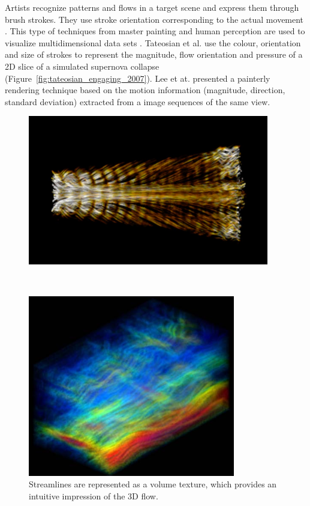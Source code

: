 Artists recognize patterns and flows in a target scene and express them through brush strokes. They use stroke orientation corresponding to the actual movement \cite{lee_motion_2009}. This type of techniques from master painting and human perception are used to visualize multidimensional data sets \cite{healey_perceptually_2004}. Tateosian et al. \cite{tateosian_engaging_2007} use the colour, orientation and size of strokes to represent the magnitude, flow orientation and pressure of a 2D slice of a simulated supernova collapse (Figure~\ref{fig:tateosian_engaging_2007}). Lee et at. \cite{lee_motion_2009} presented a painterly rendering technique based on the motion information (magnitude, direction, standard deviation) extracted from a image sequences of the same view.

\begin{figure}
\centering
\begin{minipage}{.49\textwidth}
  \centering
    \includegraphics[width=1\linewidth]{images/interrante_strategies_1997.png}
  \caption{Streamlines are represented as a volume texture, which provides an intuitive impression of the 3D flow. \cite{interrante_strategies_1997}}
  \label{fig:interrante_strategies_1997}
\end{minipage}~
\begin{minipage}{.49\textwidth}
  \centering
    \includegraphics[width=1\linewidth]{images/liu_texture-based_2005.png}

\end{minipage}
\end{figure}
